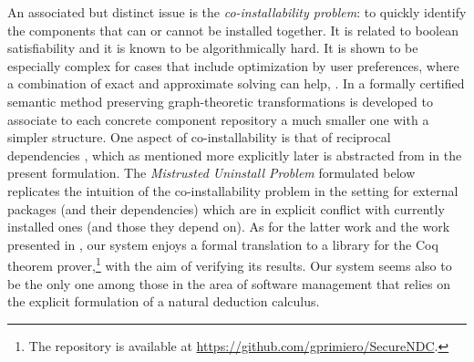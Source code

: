 \documentclass[]{llncs}
\begin{document}
An associated but distinct issue is the \textit{co-installability problem}: to quickly identify the components that can or cannot be installed together. It is related to boolean satisfiability and it is known to be algorithmically hard. It is shown to be especially complex for cases that include optimization by user preferences, where a combination of exact and approximate solving can help, \cite{Ignatiev:2014:TEO:2568225.2568306}. In \cite{Vouillon:2013:SCC:2522920.2522927} a formally certified semantic method preserving graph-theoretic transformations is developed to associate to each concrete component repository a much smaller one with a simpler structure. One aspect of co-installability is that of reciprocal dependencies \cite{DBLP:journals/eceasst/Boender11}, which as mentioned more explicitly later is abstracted from in the present formulation. The \textit{Mistrusted Uninstall Problem} formulated below replicates the intuition of the co-installability problem in the setting for external packages (and their dependencies) which are in explicit conflict with currently installed ones (and those they depend on). As for the latter work and the work presented in  \cite{DBLP:journals/jss/AbateCTZ12}, our system enjoys a formal translation to a library for the Coq theorem prover,\footnote{The repository is available at \url{https://github.com/gprimiero/SecureNDC}.} with the aim of verifying its results. Our system seems also to be the only one among those in the area of software management that relies on the explicit formulation of a natural deduction calculus.
\end{document}
